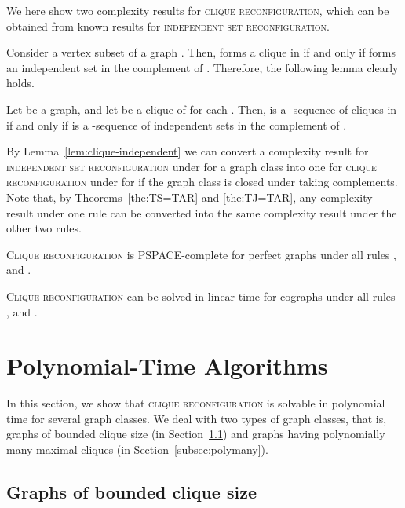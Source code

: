 \documentclass{llncs}
\newcounter{one}
\newcounter{two}
\begin{document}
	We here show two complexity results for \textsc{clique reconfiguration}, which can be obtained from known results for \textsc{independent set reconfiguration}. 

	Consider a vertex subset  of a graph . 
	Then,  forms a clique in  if and only if  forms an independent set in the complement  of .
	Therefore, the following lemma clearly holds.
	\begin{lemma} \label{lem:clique-independent}
	Let  be a graph, and let  be a clique of  for each .
	Then,  is a -sequence of cliques in 
if and only if
 is a -sequence of independent sets in the complement  of .
	\end{lemma}

	By Lemma~\ref{lem:clique-independent} we can convert a complexity result for \textsc{independent set reconfiguration} under  for a graph class  into one for \textsc{clique reconfiguration} under  for  if the graph class  is closed under taking complements. 
	Note that, by Theorems~\ref{the:TS=TAR} and \ref{the:TJ=TAR}, any complexity result under one rule can be converted into the same complexity result under the other two rules. 

	\begin{proposition} \label{pro:perfect}
	\textsc{Clique reconfiguration} is PSPACE-complete for perfect graphs under all rules ,  and .
	\end{proposition}

\begin{proposition} \label{pro:cograph}
	\textsc{Clique reconfiguration} can be solved in linear time for cographs under all rules ,  and .
	\end{proposition}






	\section{Polynomial-Time Algorithms} \label{sec:polytime}
	In this section, we show that \textsc{clique reconfiguration} is solvable in polynomial time for several graph classes. 
	We deal with two types of graph classes, that is, graphs of bounded clique size (in Section~\ref{subsec:boundedclique}) and graphs having polynomially many maximal cliques (in Section~\ref{subsec:polymany}).

	\subsection{Graphs of bounded clique size}
	\label{subsec:boundedclique}
	
\end{document}
